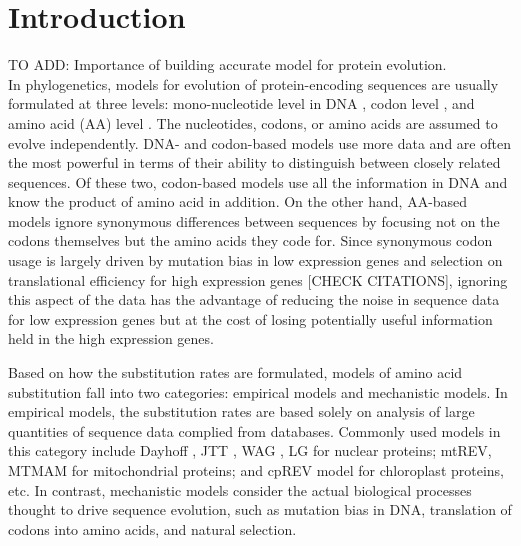\section{Introduction}

TO ADD: Importance of building accurate model for protein evolution. \\

In phylogenetics, models for evolution of protein-encoding sequences are usually formulated at three levels: mono-nucleotide level in DNA \citep[e.g., see][]{jukes1969evolution, kimura1980, felsenstein1981evolutionary, hasegawa1985dating}, codon level \citep[see][]{GoldmanYang1994,muse1994,yang1998models,yang2008mutation}, and amino acid (AA) level \citep[see][]{kishino1990maximum}.
The nucleotides, codons, or amino acids are assumed to evolve independently.
DNA- and codon-based models use more data and are often the most powerful in terms of their ability to distinguish between closely related sequences. 
Of these two, codon-based models use all the information in DNA and know the product of amino acid in addition. On the other hand, AA-based models ignore synonymous differences between sequences by focusing not on the codons themselves but the amino acids they code for. 
Since synonymous codon usage is largely driven by mutation bias in low expression genes and selection on translational efficiency for high expression genes \citep[see][]{Gilchrist2007}[CHECK CITATIONS], ignoring this aspect of the data has the advantage of reducing the noise in sequence data for low expression genes but at the cost of losing potentially useful information held in the high expression genes.

Based on how the substitution rates are formulated, models of amino acid substitution fall into two categories: empirical models and mechanistic models. 
In empirical models, the substitution rates are based solely on analysis of large quantities of sequence data complied from databases.
Commonly used models in this category include  Dayhoff \citep{dayhoff1978model}, JTT \citep{jones1992rapid}, WAG \citep{whelan2001general}, LG \citep{lg2008improved} for nuclear proteins; mtREV, MTMAM \citep{adachi1996model, yang1998models} for mitochondrial proteins; and cpREV \citep{adachi2000plastid} model for chloroplast proteins, etc. \citep[see][]{cao1994phylogenetic, henikoff1992amino, gonnet1992exhaustive} 
In contrast, mechanistic models consider the actual biological processes thought to drive sequence evolution, such as mutation bias in DNA, translation of codons into amino acids, and natural selection.

